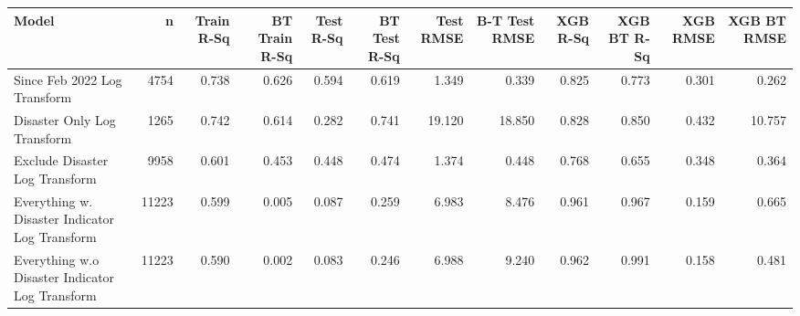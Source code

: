 
\begin{tabular}{l|r|r|r|r|r|r|r|r|r|r|r}
\hline
Model & n & Train R-Sq & BT Train R-Sq & Test R-Sq & BT Test R-Sq & Test RMSE & B-T Test RMSE & XGB R-Sq & XGB BT R-Sq & XGB RMSE & XGB BT RMSE\\
\hline
Since Feb 2022 Log Transform & 4754 & 0.738 & 0.626 & 0.594 & 0.619 & 1.349 & 0.339 & 0.825 & 0.773 & 0.301 & 0.262\\
\hline
Disaster Only Log Transform & 1265 & 0.742 & 0.614 & 0.282 & 0.741 & 19.120 & 18.850 & 0.828 & 0.850 & 0.432 & 10.757\\
\hline
Exclude Disaster Log Transform & 9958 & 0.601 & 0.453 & 0.448 & 0.474 & 1.374 & 0.448 & 0.768 & 0.655 & 0.348 & 0.364\\
\hline
Everything w. Disaster Indicator Log Transform & 11223 & 0.599 & 0.005 & 0.087 & 0.259 & 6.983 & 8.476 & 0.961 & 0.967 & 0.159 & 0.665\\
\hline
Everything w.o Disaster Indicator Log Transform & 11223 & 0.590 & 0.002 & 0.083 & 0.246 & 6.988 & 9.240 & 0.962 & 0.991 & 0.158 & 0.481\\
\hline
\end{tabular}
